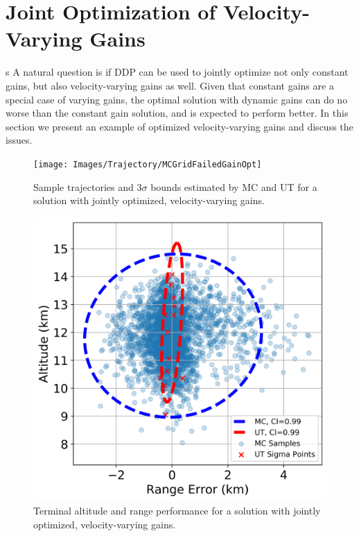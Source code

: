 \section{Joint Optimization of Velocity-Varying Gains}s
A natural question is if DDP can be used to jointly optimize not only constant gains, but also velocity-varying gains as well. Given that constant gains are a special case of varying gains, the optimal solution with dynamic gains can do no worse than the constant gain solution, and is expected to perform better. In this section we present an example of optimized velocity-varying gains and discuss the issues. 
\begin{figure}[h!]
	\centering
	\texttt{[image: Images/Trajectory/MCGridFailedGainOpt]}
	\caption{Sample trajectories and 3$\sigma$ bounds estimated by MC and UT for a solution with jointly optimized, velocity-varying gains.}
	\label{Fig:GainOptTrajectory}
\end{figure}
\begin{figure}[h!]
	\centering
	\includegraphics[width=1\textwidth]{Images/Trajectory/AltitudeRangeScatterFailedGainOpt}
	\caption{Terminal altitude and range performance for a solution with jointly optimized, velocity-varying gains.}
	\label{Fig:GainOptScatter}
\end{figure}
